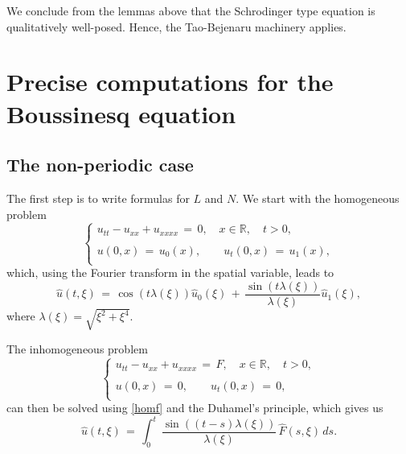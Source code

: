 \documentclass{amsart}
\begin{document}
%
%
We conclude from the lemmas above that the Schrodinger type equation is
qualitatively well-posed. Hence, the Tao-Bejenaru machinery applies.
%
%


\section{Precise computations for the Boussinesq equation}

\subsection{The non-periodic case} The first step is to write formulas for $L$ and $N$. We start with the homogeneous problem
\begin{equation}
\left\{
\begin{array}{l}
u_{tt}-u_{xx}+u_{xxxx}\,=\,0, \quad x\in\mathbb{R}, \quad t>0,\\
\\
u(0,x)\,=\,u_0(x),\qquad u_t(0,x)\,=\,u_1(x),\\
\end{array}\right.
\label{hom}
\end{equation}
which, using the Fourier transform in the spatial variable, leads to
\begin{equation}
\hat{u}(t,\xi)\,=\,\cos(t \lambda(\xi)) \hat{u}_0(\xi)\,+\,\frac{\sin(t \lambda(\xi))}{\lambda(\xi)} \hat{u}_1(\xi),
\label{homf}\end{equation}
where $\lambda(\xi)=\sqrt{\xi^2+\xi^4}$.

The inhomogeneous problem 
\begin{equation}
\left\{
\begin{array}{l}
u_{tt}-u_{xx}+u_{xxxx}\,=\,F, \quad x\in\mathbb{R}, \quad t>0,\\
\\
u(0,x)\,=\,0,\qquad u_t(0,x)\,=\,0,\\
\end{array}\right.
\label{ih}
\end{equation}
can then be solved using \eqref{homf} and the Duhamel's principle, which gives us
\begin{equation}
\hat{u}(t,\xi)\,=\,\int_0^t\,\frac{\sin((t-s) \lambda(\xi))}{\lambda(\xi)} \,\hat{F}(s,\xi)\,ds.
\label{ihf}
\end{equation}
\end{document}
